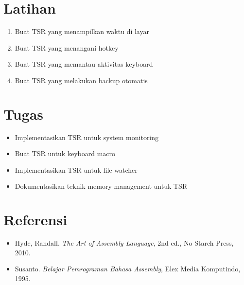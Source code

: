 \section{Latihan}
\begin{enumerate}
\item Buat TSR yang menampilkan waktu di layar
\item Buat TSR yang menangani hotkey
\item Buat TSR yang memantau aktivitas keyboard
\item Buat TSR yang melakukan backup otomatis
\end{enumerate}

\section{Tugas}
\begin{itemize}
\item Implementasikan TSR untuk system monitoring
\item Buat TSR untuk keyboard macro
\item Implementasikan TSR untuk file watcher
\item Dokumentasikan teknik memory management untuk TSR
\end{itemize}

\section{Referensi}
\begin{itemize}
\item Hyde, Randall. \textit{The Art of Assembly Language}, 2nd ed., No Starch Press, 2010.
\item Susanto. \textit{Belajar Pemrograman Bahasa Assembly}, Elex Media Komputindo, 1995.
\end{itemize}

